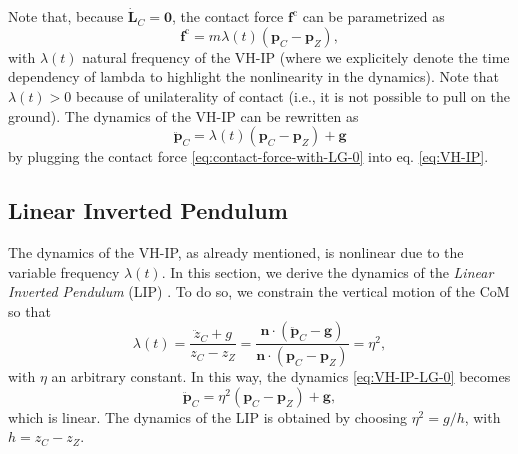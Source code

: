 Note that, because $\dot{\bm{L}}_C=\bm{0}$, the contact force
$\bm{f}^{\mathrm{c}}$ can be parametrized \cite{Caron2020ICRA} as
\begin{equation}
    \label{eq:contact-force-with-LG-0}
    \bm{f}^{\mathrm{c}} = m \lambda(t) (\bm{p}_C - \bm{p}_Z),
\end{equation}
with $\lambda(t)$ natural frequency of the VH-IP (where we explicitely
denote the time dependency of lambda to highlight the nonlinearity in the
dynamics). Note that $\lambda(t) > 0$ because
of unilaterality of contact (i.e., it is not possible to pull on the ground).
The dynamics of the VH-IP can be rewritten as
\begin{equation}
    \label{eq:VH-IP-LG-0}
    \ddot{\bm{p}}_C = \lambda(t) (\bm{p}_C - \bm{p}_Z) + \bm{g}
\end{equation}
by plugging the contact force \eqref{eq:contact-force-with-LG-0} into
eq. \eqref{eq:VH-IP}.


\subsection{Linear Inverted Pendulum}
The dynamics of the VH-IP, as already mentioned, is nonlinear due to the
variable frequency $\lambda(t)$. In this
section, we derive the dynamics of the \textit{Linear Inverted Pendulum} (LIP)
\cite{Kajita2016IntroductiontoHumanoidRobotics}. To do so,
we constrain the vertical motion of the CoM \cite{Zamparelli2018SYROCO} so that
\begin{equation}
    \lambda(t) = \frac{\ddot{z}_C + g}{z_C - z_Z} =
    \frac{\bm{n} \cdot (\ddot{\bm{p}}_C - \bm{g})}{\bm{n} \cdot (\bm{p}_C - \bm{p}_Z)} =
    \eta^2,
\end{equation}
with $\eta$ an arbitrary constant. In this way,
the dynamics \eqref{eq:VH-IP-LG-0} becomes
\begin{equation}
    \label{eq:LIPM}
    \ddot{\bm{p}}_C = \eta^2 (\bm{p}_C - \bm{p}_Z) + \bm{g},
\end{equation}
which is linear. The dynamics of the LIP is obtained by choosing $\eta^2=g/h$,
with $h=z_C-z_Z$.

